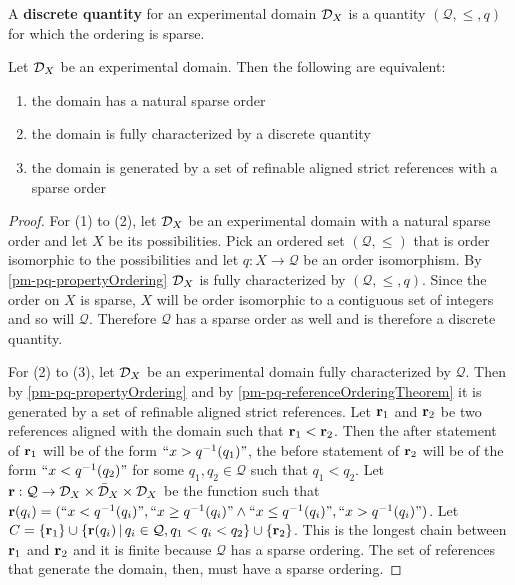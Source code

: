 \begin{mathSection}
	\begin{defn}
		A \textbf{discrete quantity} for an experimental domain $\mathcal{D}_X$ is a quantity $(\mathcal{Q}, \leq, q)$ for which the ordering is sparse.
	\end{defn}
	
	\begin{thrm}
		Let $\mathcal{D}_X$ be an experimental domain. Then the following are equivalent:
		\begin{enumerate}
			\item the domain has a natural sparse order
			\item the domain is fully characterized by a discrete quantity
			\item the domain is generated by a set of refinable aligned strict references with a sparse order
		\end{enumerate}
	\end{thrm}
	\begin{proof}
		For (1) to (2), let $\mathcal{D}_X$ be an experimental domain with a natural sparse order and let $X$ be its possibilities. Pick an ordered set $(\mathcal{Q}, \leq)$ that is order isomorphic to the possibilities and let $q: X \to \mathcal{Q}$ be an order isomorphism. By \ref{pm-pq-propertyOrdering} $\mathcal{D}_X$ is fully characterized by $(\mathcal{Q}, \leq, q)$. Since the order on $X$ is sparse, $X$ will be order isomorphic to a contiguous set of integers and so will $\mathcal{Q}$. Therefore $\mathcal{Q}$ has a sparse order as well and is therefore a discrete quantity.
		
		For (2) to (3), let $\mathcal{D}_X$ be an experimental domain fully characterized by $\mathcal{Q}$. Then by \ref{pm-pq-propertyOrdering} and by \ref{pm-pq-referenceOrderingTheorem} it is generated by a set of refinable aligned strict references. Let $\textbf{r}_1$ and $\textbf{r}_2$ be two references aligned with the domain such that $\textbf{r}_1 < \textbf{r}_2$. Then the after statement of $\textbf{r}_1$ will be of the form $``x > q^{-1}(q_1)"$, the before statement of $\textbf{r}_2$ will be of the form $``x < q^{-1}(q_2)"$ for some $q_1, q_2 \in \mathcal{Q}$ such that $q_1 < q_2$. Let $\textbf{r} : \mathcal{Q} \to \mathcal{D}_X \times \bar{\mathcal{D}}_X \times \mathcal{D}_X$ be the function such that $\textbf{r}(q_i) = (``x < q^{-1}(q_i)", ``x \geq q^{-1}(q_i)" \wedge ``x \leq q^{-1}(q_i)", ``x > q^{-1}(q_i)")$. Let $C = \{\textbf{r}_1\} \cup \{\textbf{r}(q_i) \, | \, q_i \in \mathcal{Q}, q_1 < q_i < q_2  \} \cup \{ \textbf{r}_2 \}$. This is the longest chain between $\textbf{r}_1$ and $\textbf{r}_2$ and it is finite because $\mathcal{Q}$ has a sparse ordering. The set of references that generate the domain, then, must have a sparse ordering.
		

\end{proof}
\end{mathSection}
